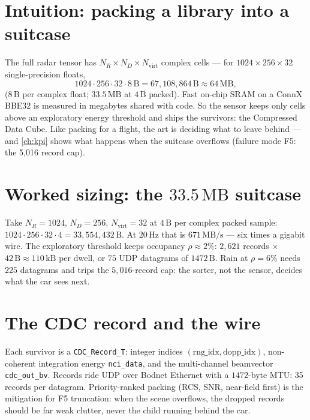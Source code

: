 \documentclass[11pt,oneside]{book}
\begin{document}
\section{Intuition: packing a library into a suitcase}
\label{sec:suitcase}

The full radar tensor has $N_R\times N_D\times N_{\mathrm{virt}}$ complex
cells --- for $1024\times256\times32$ single-precision floats,
\begin{equation}
1024\cdot256\cdot32\cdot8\,\mathrm{B} = 67{,}108{,}864\,\mathrm{B}
\approx 64\,\mathrm{MB},
\label{eq:cube-size}
\end{equation}
($8\,\mathrm{B}$ per complex float; $33.5\,\mathrm{MB}$ at $4\,\mathrm{B}$
packed). Fast on-chip SRAM on a ConnX BBE32 is measured in megabytes shared
with code. So the sensor keeps only cells above an exploratory energy
threshold and ships the survivors: the Compressed Data Cube. Like packing
for a flight, the art is deciding what to leave behind --- and \cref{ch:kpi}
shows what happens when the suitcase overflows (failure mode F5: the 5,016
record cap).

\section{Worked sizing: the $33.5\,\mathrm{MB}$ suitcase}
\label{sec:cdc-sizing}

Take $N_R=1024$, $N_D=256$, $N_{\mathrm{virt}}=32$ at $4\,\mathrm{B}$ per
complex packed sample: $1024\cdot256\cdot32\cdot4=33{,}554{,}432\,\mathrm{B}$.
At $20\,\mathrm{Hz}$ that is $671\,\mathrm{MB/s}$ --- six times a gigabit
wire. The exploratory threshold keeps occupancy $\rho\approx2\%$:
$2{,}621$ records $\times$ $42\,\mathrm{B}\approx110\,\mathrm{kB}$ per dwell,
or $75$ UDP datagrams of $1472\,\mathrm{B}$. Rain at $\rho=6\%$ needs $225$
datagrams and trips the $5{,}016$-record cap: the sorter, not the sensor,
decides what the car sees next.

\section{The CDC record and the wire}
\label{sec:cdc-record}

Each survivor is a \texttt{CDC\_Record\_T}: integer indices
$(\mathrm{rng\_idx},\mathrm{dopp\_idx})$, non-coherent integration energy
\texttt{nci\_data}, and the multi-channel beamvector \texttt{cdc\_out\_bv}.
Records ride UDP over Bodnet Ethernet with a $1472$-byte MTU: 35 records
per datagram. Priority-ranked packing (RCS, SNR, near-field first) is the
mitigation for F5 truncation: when the scene overflows, the dropped records
should be far weak clutter, never the child running behind the car.
\end{document}
